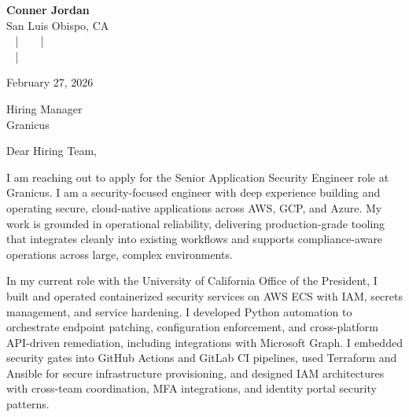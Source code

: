 \documentclass[letterpaper,11pt]{article}
\newcommand{\companyname}{Granicus}
\begin{document}
\begin{center}
  {\Huge \textbf{Conner Jordan}}\\[4pt]
  {\Large San Luis Obispo, CA}\\[4pt]
  \href{tel:+18059759793}{
    } ~ | ~
  \href{mailto:connercharlesjordan@gmail.com}{
    } ~ | ~
   \\
  \href{https://www.linkedin.com/in/conner-jordan-4b268514a/}{
    } ~ | ~
  \href{https://github.com/cjordan223}{
    }
\end{center}

\vspace{16pt}

\begin{flushright}
February 27, 2026
\end{flushright}

Hiring Manager\\
\companyname

\vspace{26pt}

\noindent
Dear Hiring Team,

\vspace{16pt}

I am reaching out to apply for the Senior Application Security Engineer role at Granicus. I am a security-focused engineer with deep experience building and operating secure, cloud-native applications across AWS, GCP, and Azure. My work is grounded in operational reliability, delivering production-grade tooling that integrates cleanly into existing workflows and supports compliance-aware operations across large, complex environments.

\vspace{16pt}

In my current role with the University of California Office of the President, I built and operated containerized security services on AWS ECS with IAM, secrets management, and service hardening. I developed Python automation to orchestrate endpoint patching, configuration enforcement, and cross-platform API-driven remediation, including integrations with Microsoft Graph. I embedded security gates into GitHub Actions and GitLab CI pipelines, used Terraform and Ansible for secure infrastructure provisioning, and designed IAM architectures with cross-team coordination, MFA integrations, and identity portal security patterns.
\end{document}
